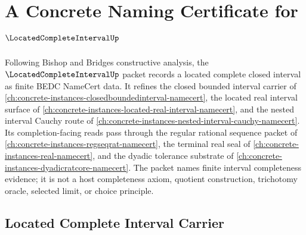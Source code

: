 \chapter{A Concrete Naming Certificate for $\LocatedCompleteIntervalUp$}
\label{ch:concrete-instances-located-complete-interval-namecert}

Following Bishop and Bridges constructive analysis, the $\LocatedCompleteIntervalUp$ packet records a located complete closed interval as finite BEDC NameCert data. It refines the closed bounded interval carrier of \autoref{ch:concrete-instances-closedboundedinterval-namecert}, the located real interval surface of \autoref{ch:concrete-instances-located-real-interval-namecert}, and the nested interval Cauchy route of \autoref{ch:concrete-instances-nested-interval-cauchy-namecert}. Its completion-facing reads pass through the regular rational sequence packet of \autoref{ch:concrete-instances-regseqrat-namecert}, the terminal real seal of \autoref{ch:concrete-instances-real-namecert}, and the dyadic tolerance substrate of \autoref{ch:concrete-instances-dyadicratcore-namecert}. The packet names finite interval completeness evidence; it is not a host completeness axiom, quotient construction, trichotomy oracle, selected limit, or choice principle.

\section{Located Complete Interval Carrier}
\label{sec:located-complete-interval-carrier}

